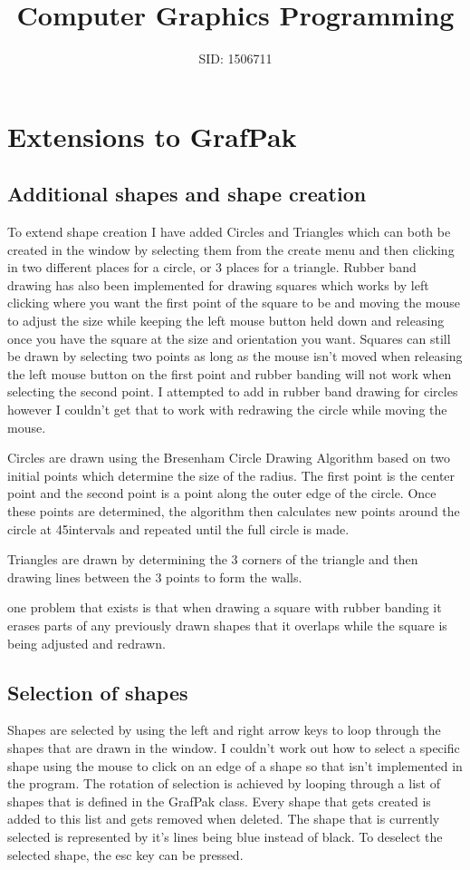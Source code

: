 \documentclass[8pt, openany]{extreport}
\renewcommand{\footrulewidth}{0pt}
\begin{document}
	\title{Computer Graphics Programming}
	\author{SID: 1506711}
	\cfoot{\thepage}
    	\renewcommand{\footrulewidth}{0pt}
	\maketitle
	\section{Extensions to GrafPak}
		\subsection{Additional shapes and shape creation}
		To extend shape creation I have added Circles and Triangles which can both be created in the window by selecting them from the create menu and then clicking in two different places for a circle, or 3 places for a triangle. Rubber band drawing has also been implemented for drawing squares which works by left clicking where you want the first point of the square to be and moving the mouse to adjust the size while keeping the left mouse button held down and releasing once you have the square at the size and orientation you want. Squares can still be drawn by selecting two points as long as the mouse isn't moved when releasing the left mouse button on the first point and rubber banding will not work when selecting the second point. I attempted to add in rubber band drawing for circles however I couldn't get that to work with redrawing the circle while moving the mouse. 

Circles are drawn using the Bresenham Circle Drawing Algorithm based on two initial points which determine the size of the radius. The first point is the center point and the second point is a point along the outer edge of the circle. Once these points are determined, the algorithm then calculates new points around the circle at 45\textdegree intervals and repeated until the full circle is made.

Triangles are drawn by determining the 3 corners of the triangle and then drawing lines between the 3 points to form the walls.

one problem that exists is that when drawing a square with rubber banding it erases parts of any previously drawn shapes that it overlaps while the square is being adjusted and redrawn.

		\subsection{Selection of shapes}
		Shapes are selected by using the left and right arrow keys to loop through the shapes that are drawn in the window. I couldn't work out how to select a specific shape using the mouse to click on an edge of a shape so that isn't implemented in the program. The rotation of selection is achieved by looping through a list of shapes that is defined in the GrafPak class. Every shape that gets created is added to this list and gets removed when deleted. The shape that is currently selected is represented by it's lines being blue instead of black. To deselect the selected shape, the esc key can be pressed.
\end{document}
